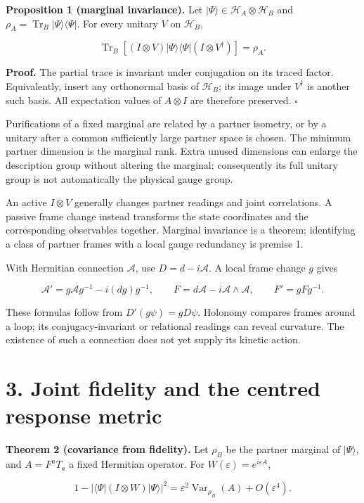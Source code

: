 \documentclass[
  11pt,
  a4paper,
]{article}
\begin{document}
\textbf{Proposition 1 (marginal invariance).} Let \(|\Psi\rangle\in\mathcal H_A\otimes\mathcal H_B\) and \(\rho_A=\operatorname{Tr}_B|\Psi\rangle\langle\Psi|\). For every unitary \(V\) on \(\mathcal H_B\),

\[
 \operatorname{Tr}_B[(I\otimes V)|\Psi\rangle\langle\Psi|(I\otimes V^\dagger)]
 =\rho_A.
\]

\textbf{Proof.} The partial trace is invariant under conjugation on its traced factor. Equivalently, insert any orthonormal basis of \(\mathcal H_B\); its image under \(V^\dagger\) is another such basis. All expectation values of \(A\otimes I\) are therefore preserved. \(\square\)

Purifications of a fixed marginal are related by a partner isometry, or by a unitary after a common sufficiently large partner space is chosen. The minimum partner dimension is the marginal rank. Extra unused dimensions can enlarge the description group without altering the marginal; consequently its full unitary group is not automatically the physical gauge group.

An active \(I\otimes V\) generally changes partner readings and joint correlations. A passive frame change instead transforms the state coordinates and the corresponding observables together. Marginal invariance is a theorem; identifying a class of partner frames with a local gauge redundancy is premise 1.

With Hermitian connection \(\mathcal A\), use \(D=d-i\mathcal A\). A local frame change \(g\) gives

\[
 \mathcal A'=g\mathcal A g^{-1}-i(dg)g^{-1},\qquad
 F=d\mathcal A-i\mathcal A\wedge\mathcal A,\qquad F'=gFg^{-1}.
\]

These formulas follow from \(D'(g\psi)=gD\psi\). Holonomy compares frames around a loop; its conjugacy-invariant or relational readings can reveal curvature. The existence of such a connection does not yet supply its kinetic action.

\section{3. Joint fidelity and the centred response metric}\label{joint-fidelity-and-the-centred-response-metric}

\textbf{Theorem 2 (covariance from fidelity).} Let \(\rho_B\) be the partner marginal of \(|\Psi\rangle\), and \(A=F^aT_a\) a fixed Hermitian operator. For \(W(\varepsilon)=e^{i\varepsilon A}\),

\[
 1-|\langle\Psi|(I\otimes W)|\Psi\rangle|^2
 =\varepsilon^2\operatorname{Var}_{\rho_B}(A)+O(\varepsilon^4).
\]
\end{document}
